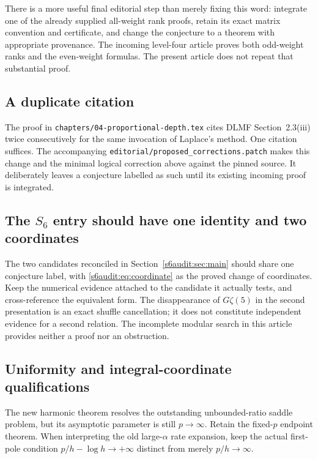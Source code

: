 \documentclass[11pt,a4paper]{article}
\numberwithin{equation}{section}
\theoremstyle{plain}
\theoremstyle{definition}
\theoremstyle{remark}
\newcommand{\src}[1]{\nolinkurl{#1}}
\begin{document}
There is a more useful final editorial step than merely fixing this
word: integrate one of the already supplied all-weight rank proofs,
retain its exact matrix convention and certificate, and change the
conjecture to a theorem with appropriate provenance. The incoming
level-four article proves both odd-weight ranks and the even-weight
formulas. The present article does not repeat that substantial proof.

\subsection{A duplicate citation}

The proof in \src{chapters/04-proportional-depth.tex} cites DLMF
Section~2.3(iii) twice consecutively for the same invocation of
Laplace's method. One citation suffices. The accompanying
\src{editorial/proposed_corrections.patch} makes this change and the
minimal logical correction above against the pinned source.
It deliberately leaves a conjecture labelled as such until its
existing incoming proof is integrated.

\subsection[The S6 entry should have one identity and two coordinates]{The $S_6$ entry should have one identity and two coordinates}

The two candidates reconciled in Section~\ref{s6audit:sec:main}
should share one conjecture label, with
\eqref{s6audit:eq:coordinate} as the proved change of coordinates.
Keep the numerical evidence attached to the candidate it actually
tests, and cross-reference the equivalent form. The disappearance of
$G\zeta(5)$ in the second presentation is an exact shuffle
cancellation; it does not constitute independent evidence for a
second relation. The incomplete modular search in this article
provides neither a proof nor an obstruction.

\subsection{Uniformity and integral-coordinate qualifications}

The new harmonic theorem resolves the outstanding unbounded-ratio
saddle problem, but its asymptotic parameter is still $p\to\infty$.
Retain the fixed-$p$ endpoint theorem. When interpreting the old
large-$\alpha$ rate expansion, keep the actual first-pole condition
$p/h-\log h\to+\infty$ distinct from merely $p/h\to\infty$.
\end{document}
